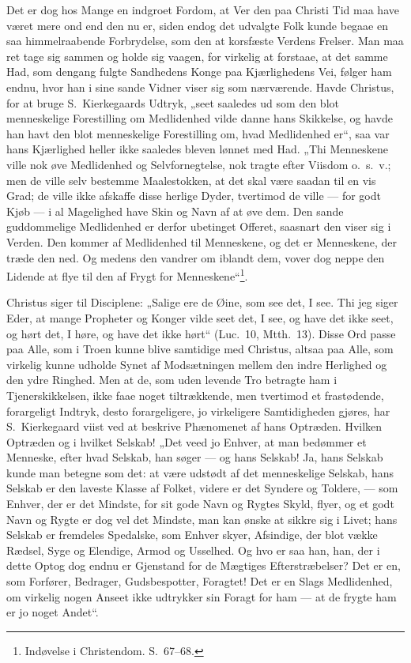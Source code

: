 \documentclass[12pt]{book}
\begin{document}
Det er dog hos Mange en indgroet Fordom, at Ver\-
den paa Christi Tid maa have været mere ond end den nu er, siden
endog det udvalgte Folk kunde begaae en saa himmelraabende
Forbrydelse, som den at korsfæste Verdens Frelser. Man maa ret tage
sig sammen og holde sig vaagen, for virkelig at forstaae, at det
samme Had, som dengang fulgte Sandhedens Konge paa Kjærlighedens
Vei, følger ham endnu, hvor han i sine sande Vidner viser sig som
nærværende. Havde Christus, for at bruge S.\ Kierkegaards Udtryk,
„seet saaledes ud som den blot menneskelige Forestilling om
Medlidenhed vilde danne hans Skikkelse, og havde han havt den blot
menneskelige Forestilling om, hvad Medlidenhed er“, saa var hans
Kjærlighed heller ikke saaledes bleven lønnet med Had. „Thi
Menneskene ville nok øve Medlidenhed og Selvfornegtelse, nok tragte
efter Viisdom o.\ s.\ v.; men de ville selv bestemme Maalestokken,
at det skal være saadan til en vis Grad; de ville ikke afskaffe
disse herlige Dyder, tvertimod de ville --- for godt Kjøb --- i al
Magelighed have Skin og Navn af at øve dem. Den sande guddommelige
Medlidenhed er derfor ubetinget Offeret, saasnart den viser sig i
Verden. Den kommer af Medlidenhed til Menneskene, og det er
Menneskene, der træde den ned. Og medens den vandrer om iblandt dem,
vover dog neppe den Lidende at flye til den af Frygt for
Menneskene“\footnote{Indøvelse i Christendom. S.\ 67--68.}.

Christus siger til Disciplene: „Salige ere de Øine, som see det, I
see. Thi jeg siger Eder, at mange Propheter og Konger vilde seet
det, I see, og have det ikke seet, og hørt det, I høre, og have det
ikke hørt“ (Luc.\ 10, Mtth.\ 13). Disse Ord passe paa Alle, som i
Troen kunne blive samtidige med Christus, altsaa paa Alle, som
virkelig kunne udholde Synet af Modsætningen mellem den indre
Herlighed og den ydre Ringhed. Men at de, som uden levende Tro
betragte ham i Tjenerskikkelsen, ikke
faae noget tiltrækkende, men tvertimod et frastødende, forargeligt
Indtryk, desto forargeligere, jo virkeligere Samtidigheden gjøres,
har S.\ Kierkegaard viist ved at beskrive Phænomenet af hans
Optræden. Hvilken Optræden og i hvilket Selskab! „Det veed jo
Enhver, at man bedømmer et Menneske, efter hvad Selskab, han søger
--- og hans Selskab! Ja, hans Selskab kunde man betegne som det: at
være udstødt af det menneskelige Selskab, hans Selskab er den laveste
Klasse af Folket, videre er det Syndere og Toldere, --- som Enhver,
der er det Mindste, for sit gode Navn og Rygtes Skyld, flyer, og et
godt Navn og Rygte er dog vel det Mindste, man kan ønske at sikkre
sig i Livet; hans Selskab er fremdeles Spedalske, som Enhver skyer,
Afsindige, der blot vække Rædsel, Syge og Elendige, Armod og
Usselhed. Og hvo er saa han, han, der i dette Optog dog endnu er
Gjenstand for de Mægtiges Efterstræbelser? Det er en, som Forfører,
Bedrager, Gudsbespotter, Foragtet! Det er en Slags Medlidenhed, om
virkelig nogen Anseet ikke udtrykker sin Foragt for ham --- at de
frygte ham er jo noget Andet“.
\end{document}
